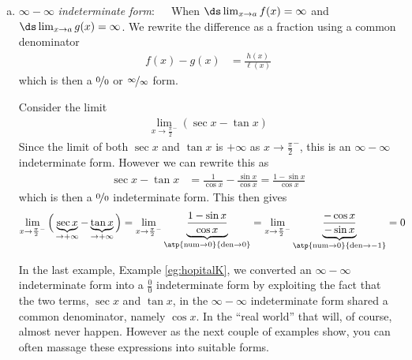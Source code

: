 \begin{enumerate}[(a)]
\begin{eg}
\end{eg}


\item $\infty-\infty$ \emph{indeterminate form}:\ \ \ When $\ds \lim_{x\to a}f(x) =
\infty$ and $\ds \lim_{x\to a} g(x) = \infty$. We rewrite the difference as a fraction
using a common denominator
\begin{align*}
  f(x) - g(x) &= \frac{h(x)}{\ell(x)}
\end{align*}
which is then a $\nicefrac{0}{0}$ or $\nicefrac{\infty}{\infty}$ form.
\begin{eg}\label{eg:hopitalK}
Consider the limit
\begin{align*}
\lim_{x\to \frac{\pi}{2}^-} \left( \sec x - \tan x\right)
\end{align*}
Since the limit of both $\sec x$ and $\tan x$ is $+\infty$ as $x \to
\frac{\pi}{2}^-$, this is an $\infty-\infty$ indeterminate form. However we can
rewrite this as
\begin{align*}
  \sec x - \tan x &= \frac{1}{\cos x} - \frac{\sin x}{\cos x} = \frac{1-\sin x}{\cos x}
\end{align*}
which is then a $\nicefrac00$ indeterminate form. This then gives
\begin{align*}
\lim_{x\rightarrow \frac{\pi}{2}^-}\Big(
                \underbrace{\sec x}_{\rightarrow +\infty}
                     - \underbrace{\tan x}_{\rightarrow+\infty}\Big)
& =\lim_{x\rightarrow \frac{\pi}{2}^-}\underbrace{\frac{1-\sin x}
     {\cos x}}_{\atp
        {\mathrm{num}\rightarrow 0}
        {\mathrm{den}\rightarrow 0}}
 =\lim_{x\rightarrow \frac{\pi}{2}^-}\underbrace{\frac{-\cos x}
     {-\sin x}}_{\atp
        {\mathrm{num}\rightarrow 0}
        {\mathrm{den}\rightarrow -1}}
=0
\end{align*}
\end{eg}\goodbreak
In the last example, Example \ref{eg:hopitalK}, we converted an
$\infty-\infty$ indeterminate form into a $\frac{0}{0}$ indeterminate form
by exploiting the fact that the two terms, $\sec x$ and $\tan x$,
in the $\infty-\infty$ indeterminate form shared a common denominator,
namely $\cos x$.
In the ``real world'' that will, of course, almost never happen. However as the next
couple of examples show, you can often massage these expressions into suitable forms.



\end{enumerate}
